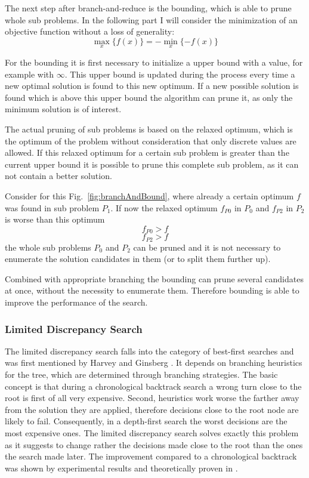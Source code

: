 \documentclass[10pt,
               a4paper,
               journal,
               ]{IEEEtran}
\newcommand{\reffig}[1]{{Fig.~\ref{#1}}}
\begin{document}
	The next step after branch-and-reduce is the bounding, which is able to prune whole sub problems. In the following part I will consider the minimization of an objective function without a loss of generality:
	\begin{equation}
		\max_x \{f(x)\} = -\min_x \{-f(x)\}
	\end{equation}
	
	For the bounding it is first necessary to initialize a upper bound with a value, for example with $\infty$. This upper bound is updated during the process every time a new optimal solution is found to this new optimum. If a new possible solution is found which is above this upper bound the algorithm can prune it, as only the minimum solution is of interest. 
	
	The actual pruning of sub problems is based on the relaxed optimum, which is the optimum of the problem without consideration that only discrete values are allowed. If this relaxed optimum for a certain sub problem is greater than the current upper bound it is possible to prune this complete sub problem, as it can not contain a better solution.
	
	Consider for this \reffig{fig:branchAndBound}, where already a certain optimum $f$ was found in sub problem $P_1$. If now the relaxed optimum $f_{P0}$ in $P_0$ and $f_{P2}$ in $P_2$ is worse than this optimum
	\begin{equation}
		f_{P0} > f
	\end{equation}
	\begin{equation}
		f_{P2} > f
	\end{equation}
	the whole sub problems $P_{0}$ and $P_{2}$ can be pruned and it is not necessary to enumerate the solution candidates in them (or to split them further up).
	
	Combined with appropriate branching the bounding can prune several candidates at once, without the necessity to enumerate them. Therefore bounding is able to improve the performance of the search.
	
	\subsubsection{Limited Discrepancy Search}
	The limited discrepancy search falls into the category of best-first searches and was first mentioned by Harvey and Ginsberg \cite{limitedDiscrepancy}. It depends on branching heuristics for the tree, which are determined through branching strategies. The basic concept is that during a chronological backtrack search a wrong turn close to the root is first of all very expensive. Second, heuristics work worse the farther away from the solution they are applied, therefore decisions close to the root node are likely to fail. Consequently, in a depth-first search the worst decisions are the most expensive ones. The limited discrepancy search solves exactly this problem as it suggests to change rather the decisions made close to the root than the ones the search made later. The improvement compared to a chronological backtrack was shown by experimental results and theoretically proven in \cite{limitedDiscrepancy}.
	
\end{document}
